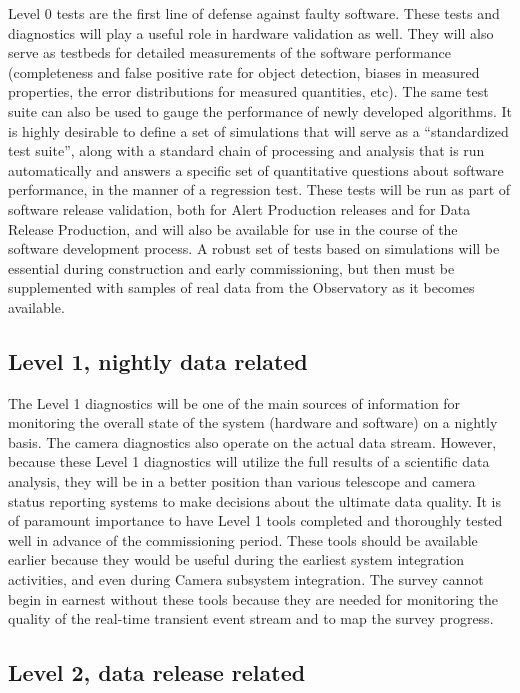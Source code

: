 \documentclass[SE,toc]{lsstdoc}
\begin{document}
Level 0 tests are the first line of defense against faulty software. These tests and diagnostics will
play a useful role in hardware validation as well.  They will also serve
as testbeds for detailed measurements of the software performance (completeness
and false positive rate for object detection, biases in measured properties, the error
distributions for measured quantities, etc). The same test suite can also be used to gauge
the performance of newly developed algorithms. It is highly desirable to define a set
of simulations that will serve as a ``standardized test suite'', along with a standard chain of processing
and analysis that is run automatically and answers a specific set of quantitative questions
about software performance, in the manner of a regression test.  These tests will be run as part of software release validation, both for Alert Production releases and for Data Release Production, and will also be available for use in the course of the software development process.  A robust set of tests based on simulations will be essential during construction and early commissioning, but then must be supplemented with samples of real data from the Observatory as it becomes available.


\subsection{Level 1, nightly data related}

The Level 1 diagnostics will be one of the main sources of information for monitoring
the overall state of the system (hardware and software) on a nightly basis.
The camera diagnostics also operate on the actual data stream. However, because these Level 1 diagnostics
will utilize the full results of a scientific data analysis, they will be
in a better position than various telescope and camera status reporting systems to
make decisions about the ultimate data quality. It is of paramount importance to
have Level 1 tools completed and thoroughly tested well in advance of the commissioning
period. These tools should be available earlier because they would be useful during the earliest system
integration activities, and even during Camera subsystem integration. The survey cannot begin in earnest
without these tools because they are needed for monitoring the quality of the real-time transient event
stream and to map the survey progress.


\subsection{Level 2, data release related}
\end{document}
